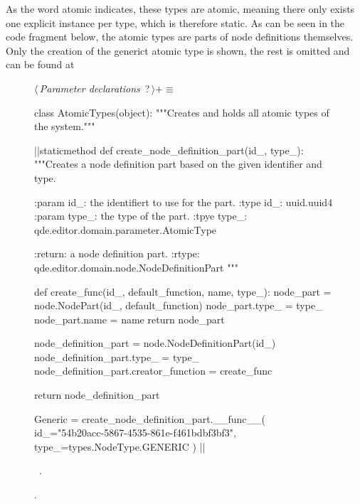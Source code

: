 \documentclass[%
    a4paper,    %
    justified,  %
    nobib,      %
    openany     %
]{tufte-book}
\makeatletter
\renewcommand{\label}[1]{\@tufte@label{##1}}%
\makeatother
\begin{document}
As the word atomic indicates, these types are atomic, meaning there only exists
one explicit instance per type, which is therefore static. As can be seen in
the code fragment below, the atomic types are parts of node definitions
themselves. Only the creation of the generict atomic type is shown, the rest is
omitted and can be found at~

\begin{figure}
\begin{flushleft} \small
\begin{minipage}{\linewidth}\label{scrap65}\raggedright\small
{} $\langle\,${\itshape Parameter declarations}\nobreak\ {\footnotesize {?}}$\,\rangle+\equiv$
\vspace{-1ex}
\begin{pythoncode}
class AtomicTypes(object):
    """Creates and holds all atomic types of the system."""

    |\normalfont{}\fontfamily{}|staticmethod
    def create_node_definition_part(id_, type_):
        """Creates a node definition part based on the given identifier and
        type.

        :param id_: the identifiert to use for the part.
        :type  id_: uuid.uuid4
        :param type_: the type of the part.
        :tpye type_: qde.editor.domain.parameter.AtomicType

        :return: a node definition part.
        :rtype: qde.editor.domain.node.NodeDefinitionPart
        """

        def create_func(id_, default_function, name, type_):
            node_part = node.NodePart(id_, default_function)
            node_part.type_ = type_
            node_part.name = name
            return node_part

        node_definition_part = node.NodeDefinitionPart(id_)
        node_definition_part.type_ = type_
        node_definition_part.creator_function = create_func

        return node_definition_part

    Generic = create_node_definition_part.__func__(
        id_="54b20acc-5867-4535-861e-f461bdbf3bf3",
        type_=types.NodeType.GENERIC
    )
|\NWsep|
\end{pythoncode}
\vspace{1.5ex}
\footnotesize
\begin{list}{}{\setlength{\itemsep}{-\parsep}\setlength{\itemindent}{-\leftmargin}}
\item \NWtxtMacroDefBy\ .
\item {\NWtxtMacroNoRef}.


\end{list}
\end{minipage}
\end{flushleft}
\end{figure}
\end{document}
